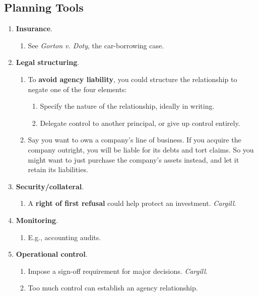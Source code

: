 \subsection{Planning Tools}

\begin{enumerate}
    \item \textbf{Insurance}.
    \begin{enumerate}
        \item See \emph{Gorton v. Doty}, the car-borrowing case.
    \end{enumerate}
    \item \textbf{Legal structuring}.
    \begin{enumerate}
        \item To \textbf{avoid agency liability}, you could structure the 
        relationship to negate one of the four elements:
        \begin{enumerate}
            \item Specify the nature of the relationship, ideally in writing.
            \item Delegate control to another principal, or give up control 
            entirely.
        \end{enumerate}
        \item Say you want to own a company's line of business. If you 
        acquire the company outright, you will be liable for its debts and 
        tort claims. So you might want to just purchase the company's assets 
        instead, and let it retain its liabilities.
    \end{enumerate}
    \item \textbf{Security/collateral}.
    \begin{enumerate}
        \item A \textbf{right of first refusal} could help protect an 
        investment. \emph{Cargill}.
    \end{enumerate}
    \item \textbf{Monitoring}.
    \begin{enumerate}
        \item E.g., accounting audits.
    \end{enumerate}
    \item \textbf{Operational control}.
    \begin{enumerate}
        \item Impose a sign-off requirement for major decisions. 
        \emph{Cargill}.
        \item Too much control can establish an agency relationship. 

\end{enumerate}
\end{enumerate}
